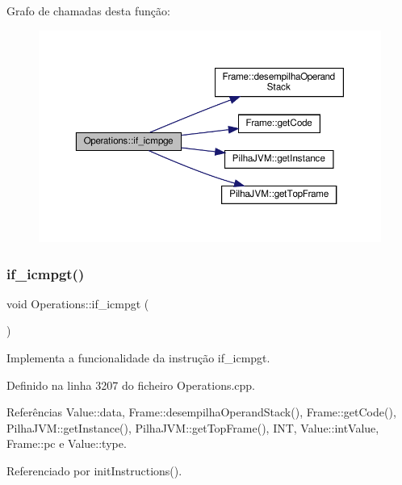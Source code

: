 Grafo de chamadas desta função\+:
\nopagebreak
\begin{figure}[H]
\begin{center}
\leavevmode
\includegraphics[width=350pt]{classOperations_a147f088fabd19030a535ac68ff091be1_cgraph}
\end{center}
\end{figure}
\mbox{\label{classOperations_a40232532d2522ef0afe261555688a7fd}} 
\subsubsection{\texorpdfstring{if\+\_\+icmpgt()}{if\_icmpgt()}}
{\footnotesize\ttfamily void Operations\+::if\+\_\+icmpgt (\begin{DoxyParamCaption}{ }\end{DoxyParamCaption})\hspace{0.3cm}{\ttfamily [private]}}



Implementa a funcionalidade da instrução if\+\_\+icmpgt. 



Definido na linha 3207 do ficheiro Operations.\+cpp.



Referências Value\+::data, Frame\+::desempilha\+Operand\+Stack(), Frame\+::get\+Code(), Pilha\+J\+V\+M\+::get\+Instance(), Pilha\+J\+V\+M\+::get\+Top\+Frame(), I\+NT, Value\+::int\+Value, Frame\+::pc e Value\+::type.



Referenciado por init\+Instructions().

